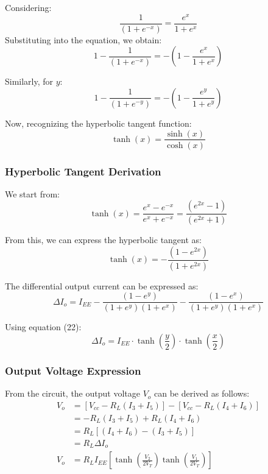 \documentclass[a4paper,9pt,twoside,openany,twocolumn]{memoir}
\begin{document}
Considering:
\begin{equation}
\frac{1}{(1 + e^{-x})} = \frac{e^{x}}{1 + e^{x}} \tag{18}
\end{equation}
Substituting into the equation, we obtain:
\begin{equation}
1 - \frac{1}{(1 + e^{-x})} = -\left(1 - \frac{e^{x}}{1 + e^{x}}\right) \tag{19}
\end{equation}

Similarly, for \( y \):
\begin{equation}
1 - \frac{1}{(1 + e^{-y})} = -\left(1 - \frac{e^{y}}{1 + e^{y}}\right) \tag{20}
\end{equation}

Now, recognizing the hyperbolic tangent function:
\begin{equation}
\tanh(x) = \frac{\sinh(x)}{\cosh(x)}
\end{equation}

\subsubsection{Hyperbolic Tangent Derivation}

We start from:
\begin{equation}
\tanh(x) = \frac{e^x - e^{-x}}{e^x + e^{-x}} = \frac{(e^{2x} - 1)}{(e^{2x} + 1)} \tag{21}
\end{equation}

From this, we can express the hyperbolic tangent as:
\begin{equation}
\tanh(x) = -\frac{(1 - e^{2x})}{(1 + e^{2x})} \tag{22}
\end{equation}

The differential output current can be expressed as:
\begin{equation}
\Delta I_o = I_{EE} - \frac{(1 - e^y)}{(1 + e^y)(1 + e^x)} - \frac{(1 - e^x)}{(1 + e^y)(1 + e^x)} \tag{23}
\end{equation}

Using equation (22):
\begin{equation}
\Delta I_o = I_{EE} \cdot \tanh\left(\frac{y}{2}\right) \cdot \tanh\left(\frac{x}{2}\right) \tag{24}
\end{equation}

\subsubsection{Output Voltage Expression}

From the circuit, the output voltage \( V_o \) can be derived as follows:
\begin{align*}
V_o &= [V_{cc} - R_L (I_3 + I_5)] - [V_{cc} - R_L (I_4 + I_6)] \\
&= - R_L (I_3 + I_5) + R_L (I_4 + I_6) \\
&= R_L [(I_4 + I_6) - (I_3 + I_5)] \\
&= R_L \Delta I_o \\
V_o &= R_L I_{EE} \left[ \tanh\left(\frac{V_2}{2V_T}\right) \tanh\left(\frac{V_1}{2V_T}\right) \right] \tag{25}
\end{align*}
\end{document}
